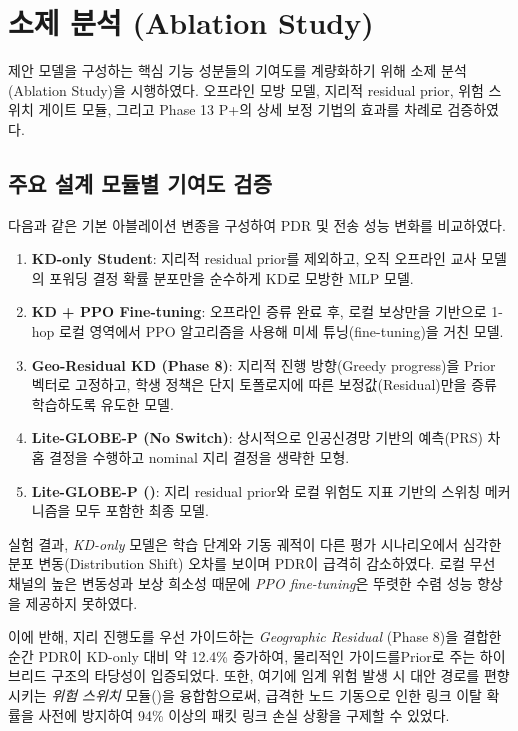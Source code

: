 \section{소제 분석 (Ablation Study)}
\label{sec:소제분석}

제안 모델을 구성하는 핵심 기능 성분들의 기여도를 계량화하기 위해 소제 분석(Ablation Study)을 시행하였다. 오프라인 모방 모델, 지리적 residual prior, 위험 스위치 게이트 모듈, 그리고 Phase 13 P+의 상세 보정 기법의 효과를 차례로 검증하였다.

\subsection{주요 설계 모듈별 기여도 검증}
다음과 같은 기본 아블레이션 변종을 구성하여 PDR 및 전송 성능 변화를 비교하였다.
\begin{enumerate}
    \item \textbf{KD-only Student}: 지리적 residual prior를 제외하고, 오직 오프라인 교사 모델의 포워딩 결정 확률 분포만을 순수하게 KD로 모방한 MLP 모델.
    \item \textbf{KD + PPO Fine-tuning}: 오프라인 증류 완료 후, 로컬 보상만을 기반으로 1-hop 로컬 영역에서 PPO 알고리즘을 사용해 미세 튜닝(fine-tuning)을 거친 모델.
    \item \textbf{Geo-Residual KD (Phase 8)}: 지리적 진행 방향(Greedy progress)을 Prior 벡터로 고정하고, 학생 정책은 단지 토폴로지에 따른 보정값(Residual)만을 증류 학습하도록 유도한 모델.
    \item \textbf{Lite-GLOBE-P (No Switch)}: 상시적으로 인공신경망 기반의 예측(PRS) 차홉 결정을 수행하고 nominal 지리 결정을 생략한 모형.
    \item \textbf{Lite-GLOBE-P (\phaseTwelve)}: 지리 residual prior와 로컬 위험도 지표 기반의 스위칭 메커니즘을 모두 포함한 최종 모델.
\end{enumerate}

실험 결과, \textit{KD-only} 모델은 학습 단계와 기동 궤적이 다른 평가 시나리오에서 심각한 분포 변동(Distribution Shift) 오차를 보이며 PDR이 급격히 감소하였다. 로컬 무선 채널의 높은 변동성과 보상 희소성 때문에 \textit{PPO fine-tuning}은 뚜렷한 수렴 성능 향상을 제공하지 못하였다.

이에 반해, 지리 진행도를 우선 가이드하는 \textit{Geographic Residual} (Phase 8)을 결합한 순간 PDR이 KD-only 대비 약 12.4\% 증가하여, 물리적인 가이드를Prior로 주는 하이브리드 구조의 타당성이 입증되었다. 또한, 여기에 임계 위험 발생 시 대안 경로를 편향시키는 \textit{위험 스위치} 모듈(\phaseTwelve)을 융합함으로써, 급격한 노드 기동으로 인한 링크 이탈 확률을 사전에 방지하여 94\% 이상의 패킷 링크 손실 상황을 구제할 수 있었다.

